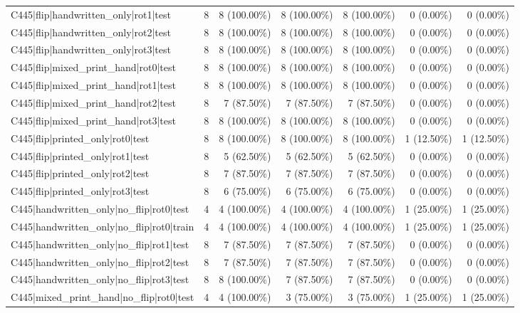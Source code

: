 \begin{longtable}{>{\raggedright\arraybackslash}p{5cm}rrrrrr}
C445|flip|handwritten\_only|rot1|test & 8 & 8 (100.00\%) & 8 (100.00\%) & 8 (100.00\%) & 0 (0.00\%) & 0 (0.00\%) \\
C445|flip|handwritten\_only|rot2|test & 8 & 8 (100.00\%) & 8 (100.00\%) & 8 (100.00\%) & 0 (0.00\%) & 0 (0.00\%) \\
C445|flip|handwritten\_only|rot3|test & 8 & 8 (100.00\%) & 8 (100.00\%) & 8 (100.00\%) & 0 (0.00\%) & 0 (0.00\%) \\
C445|flip|mixed\_print\_hand|rot0|test & 8 & 8 (100.00\%) & 8 (100.00\%) & 8 (100.00\%) & 0 (0.00\%) & 0 (0.00\%) \\
C445|flip|mixed\_print\_hand|rot1|test & 8 & 8 (100.00\%) & 8 (100.00\%) & 8 (100.00\%) & 0 (0.00\%) & 0 (0.00\%) \\
C445|flip|mixed\_print\_hand|rot2|test & 8 & 7 (87.50\%) & 7 (87.50\%) & 7 (87.50\%) & 0 (0.00\%) & 0 (0.00\%) \\
C445|flip|mixed\_print\_hand|rot3|test & 8 & 8 (100.00\%) & 8 (100.00\%) & 8 (100.00\%) & 0 (0.00\%) & 0 (0.00\%) \\
C445|flip|printed\_only|rot0|test & 8 & 8 (100.00\%) & 8 (100.00\%) & 8 (100.00\%) & 1 (12.50\%) & 1 (12.50\%) \\
C445|flip|printed\_only|rot1|test & 8 & 5 (62.50\%) & 5 (62.50\%) & 5 (62.50\%) & 0 (0.00\%) & 0 (0.00\%) \\
C445|flip|printed\_only|rot2|test & 8 & 7 (87.50\%) & 7 (87.50\%) & 7 (87.50\%) & 0 (0.00\%) & 0 (0.00\%) \\
C445|flip|printed\_only|rot3|test & 8 & 6 (75.00\%) & 6 (75.00\%) & 6 (75.00\%) & 0 (0.00\%) & 0 (0.00\%) \\
C445|handwritten\_only|no\_flip|rot0|test & 4 & 4 (100.00\%) & 4 (100.00\%) & 4 (100.00\%) & 1 (25.00\%) & 1 (25.00\%) \\
C445|handwritten\_only|no\_flip|rot0|train & 4 & 4 (100.00\%) & 4 (100.00\%) & 4 (100.00\%) & 1 (25.00\%) & 1 (25.00\%) \\
C445|handwritten\_only|no\_flip|rot1|test & 8 & 7 (87.50\%) & 7 (87.50\%) & 7 (87.50\%) & 0 (0.00\%) & 0 (0.00\%) \\
C445|handwritten\_only|no\_flip|rot2|test & 8 & 7 (87.50\%) & 7 (87.50\%) & 7 (87.50\%) & 0 (0.00\%) & 0 (0.00\%) \\
C445|handwritten\_only|no\_flip|rot3|test & 8 & 8 (100.00\%) & 7 (87.50\%) & 7 (87.50\%) & 0 (0.00\%) & 0 (0.00\%) \\
C445|mixed\_print\_hand|no\_flip|rot0|test & 4 & 4 (100.00\%) & 3 (75.00\%) & 3 (75.00\%) & 1 (25.00\%) & 1 (25.00\%) \\

\end{longtable}
